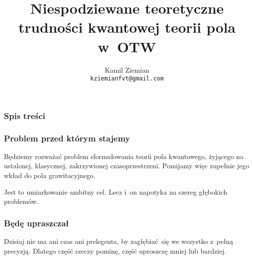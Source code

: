 \documentclass[10pt,t]{beamer}
\title{Niespodziewane teoretyczne trudności kwantowej teorii pola w~OTW}
\author{Kamil Ziemian \\
  \texttt{kziemianfvt@gmail.com}}
\begin{document}






\RaggedRight





\maketitle %





\begin{frame}
  \frametitle{Spis treści}


  \tableofcontents %

\end{frame}




\begin{frame}
  \frametitle{Problem przed którym stajemy}


  Będziemy rozważać problem sformułowania teorii pola kwantowego,
  żyjącego na ustalonej, klasycznej, zakrzywionej czasoprzestrzeni.
  Pomijamy więc zupełnie jego wkład do pola grawitacyjnego.

  Jest to umiarkowanie ambitny cel. Lecz i~on napotyka na szereg
  głębokich problemów.

\end{frame}





\begin{frame}
  \frametitle{Będę upraszczał}


  Dzisiaj nie ma ani czas ani prelegenta, by zagłębiać~się we wszystko
  z~pełną precyzją. Dlatego część rzeczy pominę, część uproszczę mniej
  lub bardziej.

\end{frame}
\end{document}
